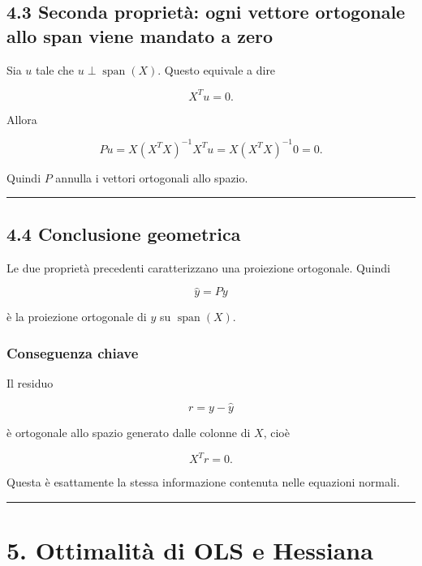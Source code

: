\documentclass[
]{article}
\begin{document}
\subsection{4.3 Seconda proprietà: ogni vettore ortogonale allo span
viene mandato a
zero}\label{seconda-proprietuxe0-ogni-vettore-ortogonale-allo-span-viene-mandato-a-zero}

Sia \(u\) tale che \(u\perp \operatorname{span}(X)\). Questo equivale a
dire

\[
X^Tu=0.
\]

Allora

\[
Pu = X(X^TX)^{-1}X^Tu = X(X^TX)^{-1}0 = 0.
\]

Quindi \(P\) annulla i vettori ortogonali allo spazio.

\begin{center}\rule{0.5\linewidth}{0.5pt}\end{center}

\subsection{4.4 Conclusione geometrica}\label{conclusione-geometrica}

Le due proprietà precedenti caratterizzano una proiezione ortogonale.
Quindi

\[
\hat y = Py
\]

è la proiezione ortogonale di \(y\) su \(\operatorname{span}(X)\).

\subsubsection{Conseguenza chiave}\label{conseguenza-chiave}

Il residuo

\[
r=y-\hat y
\]

è ortogonale allo spazio generato dalle colonne di \(X\), cioè

\[
X^Tr=0.
\]

Questa è esattamente la stessa informazione contenuta nelle equazioni
normali.

\begin{center}\rule{0.5\linewidth}{0.5pt}\end{center}

\section{5. Ottimalità di OLS e
Hessiana}\label{ottimalituxe0-di-ols-e-hessiana}
\end{document}
